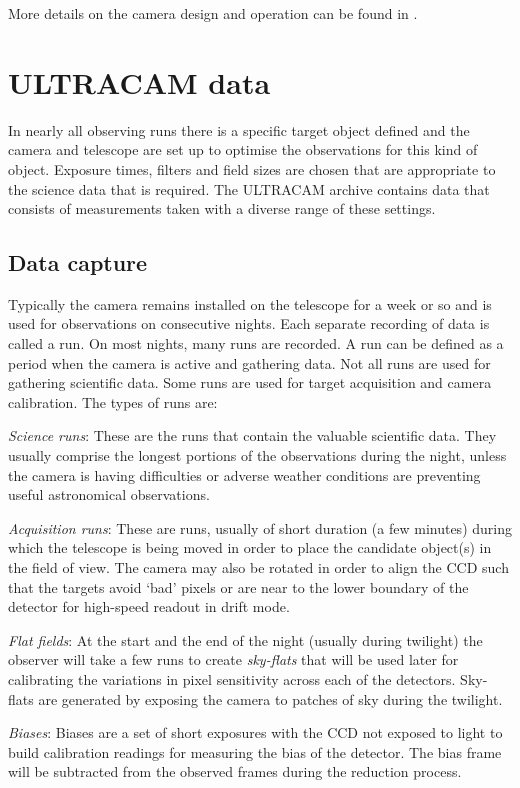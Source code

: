 More details on the camera design and operation can be found in \citet{dhillon07}.

\section{ULTRACAM data}
In nearly all observing runs there is a specific target object defined and the camera and telescope are set up to optimise the observations for this kind of object. Exposure times, filters and field sizes are chosen that are appropriate to the science data that is required. The ULTRACAM archive contains data that consists of measurements taken with a diverse range of these settings. 

\subsection{Data capture}
Typically the camera remains installed on the telescope for a week or so and is used for observations on consecutive nights. Each separate recording of data is called a run. On most nights, many runs are recorded. A run can be defined as a period when the camera is active and gathering data. Not all runs are used for gathering scientific data. Some runs are used for target acquisition and camera calibration. The types of runs are:

\emph{Science runs}: These are the runs that contain the valuable scientific data. They usually comprise the longest portions of the observations during the night, unless the camera is having difficulties or adverse weather conditions are preventing useful astronomical observations.

\emph{Acquisition runs}: These are runs, usually of short duration (a few minutes) during which the telescope is being moved in order to place the candidate object(s) in the field of view. The camera may also be rotated in order to align the CCD such that the targets avoid `bad' pixels or are near to the lower boundary of the detector for high-speed readout in drift mode. 

\emph{Flat fields}: At the start and the end of the night (usually during twilight) the observer will take a few runs to create \emph{sky-flats} that will be used later for calibrating the variations in pixel sensitivity across each of the detectors.  Sky-flats are generated by exposing the camera to patches of sky during the twilight. 

\emph{Biases}: Biases are a set of short exposures with the CCD not exposed to light to build calibration readings for measuring the bias of the detector. The bias frame will be subtracted from the observed frames during the reduction process. 

